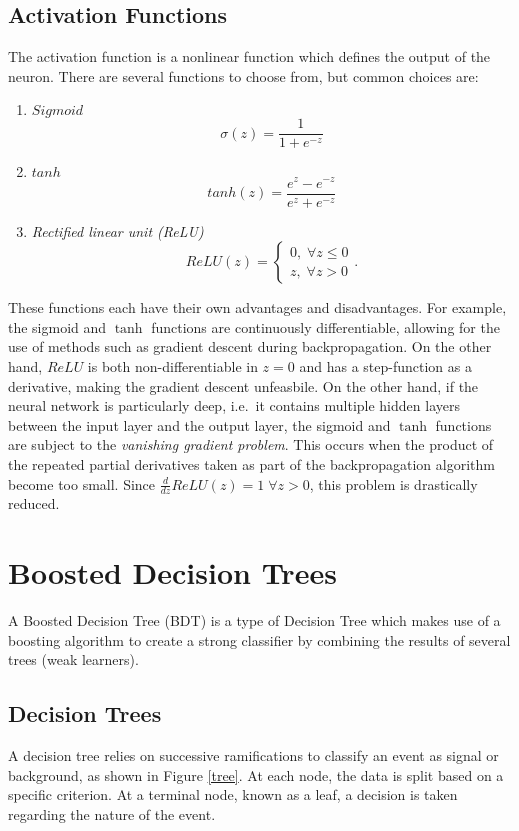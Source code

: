 \documentclass[10pt,a4paper]{book}
\begin{document}
\subsection{Activation Functions}
The activation function is a nonlinear function which defines the output of the neuron. There are several functions to choose from, but common choices are:
\begin{enumerate}
\item $Sigmoid$
\begin{equation*}
\sigma(z) = \frac{1}{1 + e^{-z}}
\end{equation*}
\item $tanh$
\begin{equation*}
tanh(z) = \frac{e^z - e^{-z}}{e^z + e^{-z}}
\end{equation*}
\item \emph{Rectified linear unit (ReLU)}
\begin{equation*}
ReLU(z) = \begin{cases}
0, \; \forall z \leq 0 \\
z, \; \forall z > 0
\end{cases}.
\end{equation*}
\end{enumerate} 
These functions each have their own advantages and disadvantages. For example, the sigmoid and $\tanh$ functions are continuously differentiable, allowing for the use of methods such as gradient descent during backpropagation. On the other hand, $ReLU$ is both non-differentiable in $z = 0$ and has a step-function as a derivative, making the gradient descent unfeasbile. On the other hand, if the neural network is particularly deep, i.e.\ it contains multiple hidden layers between the input layer and the output layer, the sigmoid and $\tanh$ functions are subject to the \emph{vanishing gradient problem}. This occurs when the product of the repeated partial derivatives taken as part of the backpropagation algorithm become too small. Since $\frac{d}{dz}ReLU(z) = 1 \; \forall z > 0$, this problem is drastically reduced.

\section{Boosted Decision Trees}
A Boosted Decision Tree (BDT) is a type of Decision Tree which makes use of a boosting algorithm to create a strong classifier by combining the results of several trees (weak learners). 

\subsection{Decision Trees}
A decision tree relies on successive ramifications to classify an event as signal or background, as shown in Figure \ref{tree}. At each node, the data is split based on a specific criterion. At a terminal node, known as a leaf, a decision is taken regarding the nature of the event.
\end{document}

